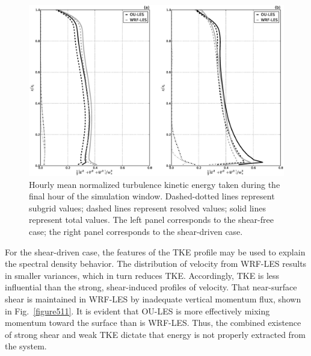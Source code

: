 \begin{figure}[!ht]
\begin{center}
\includegraphics[width=\textwidth]{figures/chapter5/tke}
\end{center}
\caption{Hourly mean normalized turbulence kinetic energy taken during the final hour of the simulation window. Dashed-dotted lines represent subgrid values; dashed lines represent resolved values; solid lines represent total values. The left panel corresponds to the shear-free case; the right panel corresponds to the shear-driven case.}
\label{figure510}
\end{figure}


For the shear-driven case, the features of the TKE profile may be used to explain the spectral density behavior. The distribution of velocity from WRF-LES results in smaller variances, which in turn reduces TKE. Accordingly, TKE is less influential than the strong, shear-induced profiles of velocity. That near-surface shear is maintained in WRF-LES by inadequate vertical momentum flux, shown in Fig.~\ref{figure511}. It is evident that OU-LES is more effectively mixing momentum toward the surface than is WRF-LES. Thus, the combined existence of strong shear and weak TKE dictate that energy is not properly extracted from the system.


